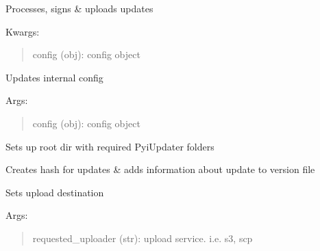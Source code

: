 \documentclass[letterpaper,10pt,english]{sphinxmanual}
\begin{document}
\begin{fulllineitems}
\label{api:pyi_updater.PyiUpdater}
Processes, signs \& uploads updates

Kwargs:
\begin{quote}

config (obj): config object
\end{quote}

\begin{fulllineitems}
\label{api:pyi_updater.PyiUpdater.update_config}
Updates internal config

Args:
\begin{quote}

config (obj): config object
\end{quote}

\end{fulllineitems}


\begin{fulllineitems}
\label{api:pyi_updater.PyiUpdater.setup}
Sets up root dir with required PyiUpdater folders

\end{fulllineitems}


\begin{fulllineitems}
\label{api:pyi_updater.PyiUpdater.process_packages}
Creates hash for updates \& adds information about update to
version file

\end{fulllineitems}


\begin{fulllineitems}
\label{api:pyi_updater.PyiUpdater.set_uploader}
Sets upload destination

Args:
\begin{quote}

requested\_uploader (str): upload service. i.e. s3, scp
\end{quote}


\end{fulllineitems}
\end{fulllineitems}
\end{document}
